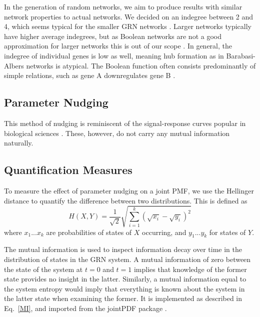 \documentclass[../main.tex]{subfiles}
\begin{document}
In the generation of random networks, we aim to produce results with similar network properties to actual networks.
We decided on an indegree between 2 and 4, which seems typical for the smaller GRN networks \cite{lahdesmaki2003learning}.
Larger networks typically have higher average indegrees, but as Boolean networks are not a good approximation for larger networks this is out of our scope \cite{lahdesmaki2003learning, karlebach2008modelling}.
In general, the indegree of individual genes is low as well, meaning hub formation as in Barabasi-Albers networks is atypical.
The Boolean function often consists predominantly of simple relations, such as gene A downregulates gene B \cite{lahdesmaki2003learning, schlitt2007current}.


\subsection{Parameter Nudging}


This method of nudging is reminiscent of the signal-response curves popular in biological sciences \cite{tyson2010functional}.
These, however, do not carry any mutual information naturally.

\subsection{Quantification Measures}

To measure the effect of parameter nudging on a joint PMF, we use the Hellinger distance to quantify the difference between two distributions.
This is defined as
%
\begin{equation}
H(X, Y) = \frac{1}{\sqrt{2}} \sqrt{\sum^k_{i=1} (\sqrt{x_i} - \sqrt{y_i})^2}
\end{equation}
%
where ${x_1 ... x_k}$ are probabilities of states of $X$ occurring, and ${y_1 ... y_k}$ for states of $Y$.

The mutual information is used to inspect information decay over time in the distribution of states in the GRN system.
A mutual information of zero between the state of the system at $t=0$ and $t=1$ implies that knowledge of the former state provides no insight in the latter.
Similarly, a mutual information equal to the system entropy would imply that everything is known about the system in the latter state when examining the former.
It is implemented as described in Eq.~\ref{MI}, and imported from the jointPDF package \cite{jointpdf}.
\end{document}
